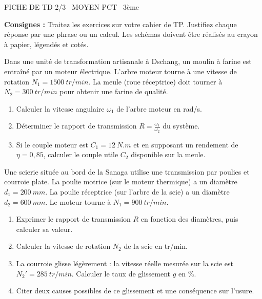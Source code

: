 \documentclass[11pt]{article}
\begin{document}
\begin{tcolorbox}[enhanced,colback=popink,colframe=popink,arc=10pt,boxrule=0pt,left=12pt,right=12pt,top=9pt,bottom=9pt]
{\color{white}\popxbold\small FICHE DE TD 2/3 \textbullet\ MOYEN \hfill PCT \textbullet\ 3ème\par}
\end{tcolorbox}
\vspace{4pt}
\noindent\textbf{Consignes :} Traitez les exercices sur votre cahier de TP. Justifiez chaque réponse par une phrase ou un calcul. Les schémas doivent être réalisés au crayon à papier, légendés et cotés.

\begin{exercice}
Dans une unité de transformation artisanale à Dschang, un moulin à farine est entraîné par un moteur électrique. L'arbre moteur tourne à une vitesse de rotation $N_1 = \SI{1500}{tr/min}$. La meule (roue réceptrice) doit tourner à $N_2 = \SI{300}{tr/min}$ pour obtenir une farine de qualité.
\begin{enumerate}
    \item Calculer la vitesse angulaire $\omega_1$ de l'arbre moteur en \si{rad/s}.
    \item Déterminer le rapport de transmission $R = \frac{\omega_1}{\omega_2}$ du système.
    \item Si le couple moteur est $C_1 = \SI{12}{N.m}$ et en supposant un rendement de $\eta = 0,85$, calculer le couple utile $C_2$ disponible sur la meule.
\end{enumerate}
\end{exercice}

\begin{exercice}
Une scierie située au bord de la Sanaga utilise une transmission par poulies et courroie plate. La poulie motrice (sur le moteur thermique) a un diamètre $d_1 = \SI{200}{mm}$. La poulie réceptrice (sur l'arbre de la scie) a un diamètre $d_2 = \SI{600}{mm}$. Le moteur tourne à $N_1 = \SI{900}{tr/min}$.
\begin{enumerate}
    \item Exprimer le rapport de transmission $R$ en fonction des diamètres, puis calculer sa valeur.
    \item Calculer la vitesse de rotation $N_2$ de la scie en \si{tr/min}.
    \item La courroie glisse légèrement : la vitesse réelle mesurée sur la scie est $N_2' = \SI{285}{tr/min}$. Calculer le taux de glissement $g$ en \%. 
    \item Citer deux causes possibles de ce glissement et une conséquence sur l'usure.
\end{enumerate}
\end{exercice}
\end{document}
